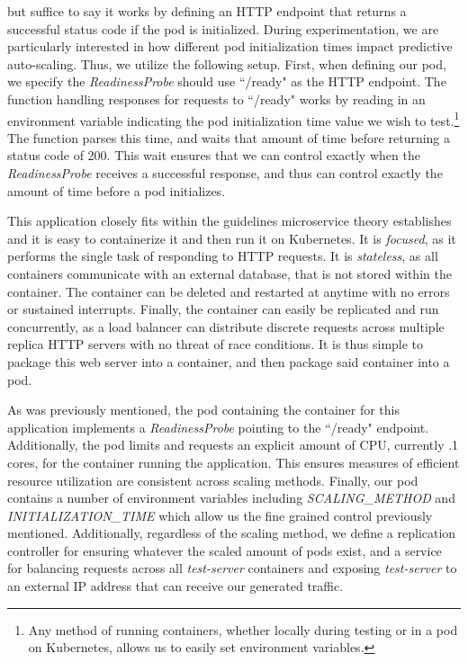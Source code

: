 \begin{itemize}
    but suffice to say it works by defining an HTTP endpoint that returns a
    successful status code if the pod is initialized. During experimentation, we
    are particularly interested in how different pod initialization times impact
    predictive auto-scaling. Thus, we utilize the following setup.
    First, when defining our pod, we specify the \textit{ReadinessProbe} should
    use ``/ready" as the HTTP endpoint. The function handling responses for
    requests to ``/ready" works by reading in an environment variable indicating
    the pod initialization time value we wish to test.\footnote{Any method of
    running containers, whether locally during testing or in a pod on
    Kubernetes, allows us to easily set environment variables.} The function parses this
    time, and waits that amount of time before returning a status code of 200.
    This wait ensures that we can control exactly when the
    \textit{ReadinessProbe} receives a successful response, and thus can
    control exactly the amount of time before a pod initializes.
\end{itemize}

This application closely fits within the guidelines microservice theory
establishes and it is easy to containerize it and then run it on Kubernetes. It
is \textit{focused}, as it performs the single task of responding to HTTP
requests. It is \textit{stateless}, as all containers communicate with an
external database, that is not stored within the container. The container can be
deleted and restarted at anytime with no errors or sustained interrupts.
Finally, the container can easily be replicated and run concurrently, as
a load balancer can distribute discrete requests across multiple replica HTTP
servers with no threat of race conditions. It is thus simple to package this
web server into a container, and then package said container into a pod.

As was previously mentioned, the pod containing the container for this
application implements a \textit{ReadinessProbe} pointing to the ``/ready"
endpoint. Additionally, the pod limits and requests an explicit amount of CPU,
currently .1 cores, for the container running the application. This ensures
measures of efficient resource utilization are consistent across scaling methods.
Finally, our pod contains a number of environment variables including
\textit{SCALING\_METHOD} and \textit{INITIALIZATION\_TIME} which allow us the
fine grained control previously mentioned. Additionally,
regardless of the scaling method, we define a replication controller for
ensuring whatever the scaled amount of pods exist, and a service for balancing
requests across all \textit{test-server} containers and exposing
\textit{test-server} to an external IP address that can receive our generated
traffic.
